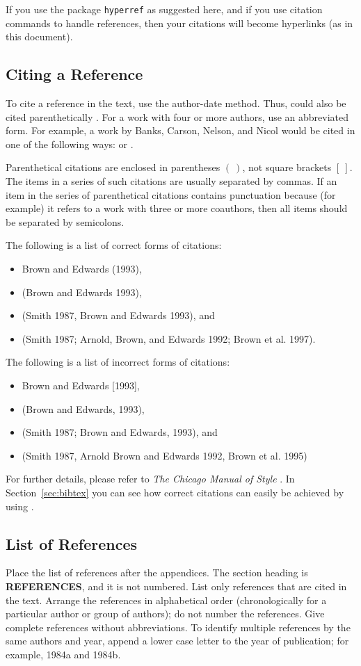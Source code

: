 \documentclass{wscpaperproc}
\theoremstyle{wsc}
\begin{document}
If you use the package {\tt hyperref} as suggested here, and if you use citation commands to handle references, then your citations will
become hyperlinks (as in this document).

\subsection{Citing a Reference}
To cite a reference in the text, use the author-date method. Thus,  could also be cited parenthetically \cite{chi89}.
For a work with four or more authors, use an abbreviated form. For example, a work by Banks, Carson, Nelson, and Nicol would be cited in one of the
following ways:
 or .

Parenthetical citations are enclosed in parentheses $(~)$, not square brackets $[~]$.
The items in a series of such citations are usually separated by commas.
If an item in the series of parenthetical citations contains punctuation because (for example) it refers to a work with three or more coauthors, then all items should be separated by semicolons.

The following is a list of correct forms of citations:
\begin{itemize}
\item Brown and Edwards (1993),
\item (Brown and Edwards 1993),
\item (Smith 1987, Brown and Edwards 1993), and
\item (Smith 1987; Arnold, Brown, and Edwards 1992; Brown et al. 1997).
\end{itemize}

The following is a list of incorrect forms of citations:
\begin{itemize}
\item Brown and Edwards [1993],
\item (Brown and Edwards, 1993),
\item (Smith 1987; Brown and Edwards, 1993), and
\item (Smith 1987, Arnold Brown and Edwards 1992, Brown et al. 1995)
\end{itemize}

For further details, please refer to {\it The Chicago Manual of Style} \cite{chicago03}. In Section~\ref{sec:bibtex} you can see how correct citations can easily be achieved by using \BibTeX .

\subsection{List of References}
Place the list of references after the appendices. The section heading is {\bf REFERENCES}, and it is not numbered. List only references that are cited in the text.
Arrange the references in alphabetical order (chronologically for a particular author or group of authors); do not number the references.
Give complete references without abbreviations.
To identify multiple references by the same authors and year, append a lower case letter to the year of publication; for example, 1984a and 1984b.
\end{document}
